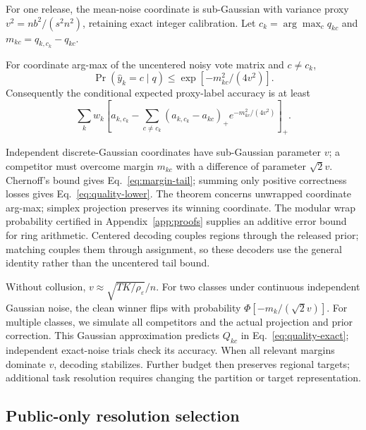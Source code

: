 For one release, the mean-noise coordinate is sub-Gaussian with variance proxy
$v^2=nb^2/(s^2n^2)$, retaining exact integer calibration.
Let $c_k=\arg\max_c q_{kc}$ and $m_{kc}=q_{k,c_k}-q_{kc}$.

\begin{theorem}
\label{thm:quality}
For coordinate arg-max of the uncentered noisy vote matrix and $c\ne c_k$,
\begin{equation}
\Pr(\hat y_k=c\mid q)\le\exp[-m_{kc}^2/(4v^2)].
\label{eq:margin-tail}
\end{equation}
Consequently the conditional expected proxy-label accuracy is at least
\begin{equation}
\sum_k w_k\left[a_{k,c_k}-\sum_{c\ne c_k}
(a_{k,c_k}-a_{kc})_+ e^{-m_{kc}^2/(4v^2)}\right]_+.
\label{eq:quality-lower}
\end{equation}
\end{theorem}

Independent discrete-Gaussian coordinates have sub-Gaussian parameter $v$;
a competitor must overcome margin $m_{kc}$ with a difference of parameter
$\sqrt2v$. Chernoff's bound gives Eq.~\eqref{eq:margin-tail}; summing only
positive correctness losses gives Eq.~\eqref{eq:quality-lower}.
The theorem concerns unwrapped coordinate arg-max; simplex projection
preserves its winning coordinate. The modular wrap probability certified in
Appendix~\ref{app:proofs} supplies an additive error bound for ring arithmetic.
Centered decoding couples regions through the released prior;
matching couples them through assignment, so these decoders use the general
identity rather than the uncentered tail bound.

Without collusion, $v\approx\sqrt{TK/\rho_\varepsilon}/n$.
For two classes under continuous independent Gaussian noise, the clean winner
flips with probability $\Phi[-m_k/(\sqrt2v)]$.
For multiple classes, we simulate all competitors and the actual projection
and prior correction. This Gaussian approximation predicts $Q_{kc}$ in
Eq.~\eqref{eq:quality-exact}; independent exact-noise trials check its accuracy.
When all relevant margins dominate $v$, decoding stabilizes. Further budget
then preserves regional targets; additional task resolution requires changing
the partition or target representation.

\subsection{Public-only resolution selection}

